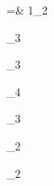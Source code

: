 =& 1_{2}\,\begin{ydpair}
  \covar{
    []  & [] 
  }
  \convar{
    [] \ensuremath{\bullet} & [] \ensuremath{\bullet}
  }
\end{ydpair} _{3}\,\begin{ydpair}
  \covar{
    []  \\[] 
  }
  \convar{
    [] \ensuremath{\bullet} & [] \ensuremath{\bullet}
  }
\end{ydpair} _{3}\,\begin{ydpair}
  \covar{
    []  & [] 
  }
  \convar{
    [] \ensuremath{\bullet} \\[] \ensuremath{\bullet}
  }
\end{ydpair} _{4}\,\begin{ydpair}
  \covar{
    []  \\[] 
  }
  \convar{
    [] \ensuremath{\bullet} \\[] \ensuremath{\bullet}
  }
\end{ydpair} _{3}\,\begin{ydpair}
  \covar{
    [] 
  }
  \convar{
    [] \ensuremath{\bullet}
  }
\end{ydpair} _{2}\,\begin{ydpair}
  \covar{
    [] 
  }
  \convar{
    [] \ensuremath{\bullet}
  }
\end{ydpair} _{2}\,\begin{ydpair}
\end{ydpair} \\

